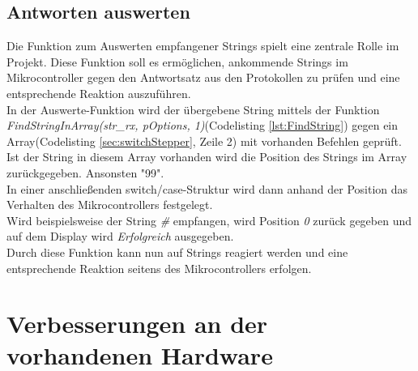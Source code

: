 \subsection{Antworten auswerten}
\label{sec:Auswerten}
Die Funktion zum Auswerten empfangener Strings spielt eine zentrale Rolle im Projekt. Diese Funktion soll es ermöglichen, ankommende Strings im Mikrocontroller gegen den Antwortsatz aus den Protokollen zu prüfen und eine entsprechende Reaktion auszuführen.\\
In der Auswerte-Funktion wird der übergebene String mittels der Funktion \emph{FindStringInArray(str\_rx, pOptions, 1)}(Codelisting \ref{lst:FindString}) gegen ein Array(Codelisting \ref{sec:switchStepper}, Zeile 2) mit vorhanden Befehlen geprüft. Ist der String in diesem Array vorhanden wird die Position des Strings im Array zurückgegeben. Ansonsten "99".\\
In einer anschließenden switch/case-Struktur wird dann anhand der Position das Verhalten des Mikrocontrollers festgelegt.\\
Wird beispielsweise der String \emph{\#} empfangen, wird Position \emph{0} zurück gegeben und auf dem Display wird \emph{Erfolgreich} ausgegeben.\\
Durch diese Funktion kann nun auf Strings reagiert werden und eine entsprechende Reaktion seitens des Mikrocontrollers erfolgen.
\lstset{language=Java, basicstyle=\footnotesize, showstringspaces=false, tabsize=8}

\lstset{language=Java, basicstyle=\footnotesize, showstringspaces=false, tabsize=8}


\section{Verbesserungen an der vorhandenen Hardware}
\label{sec:Verbesserung_Hardware}
